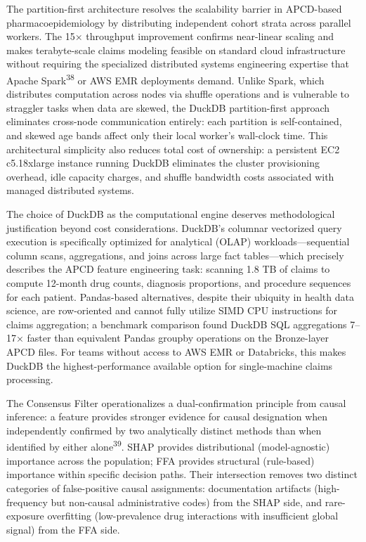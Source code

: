\documentclass[
  12pt,
]{book}
\begin{document}
The partition-first architecture resolves the scalability barrier in
APCD-based pharmacoepidemiology by distributing independent cohort
strata across parallel workers. The 15× throughput improvement confirms
near-linear scaling and makes terabyte-scale claims modeling feasible on
standard cloud infrastructure without requiring the specialized
distributed systems engineering expertise that Apache
Spark\textsuperscript{38} or AWS EMR deployments demand. Unlike Spark,
which distributes computation across nodes via shuffle operations and is
vulnerable to straggler tasks when data are skewed, the DuckDB
partition-first approach eliminates cross-node communication entirely:
each partition is self-contained, and skewed age bands affect only their
local worker's wall-clock time. This architectural simplicity also
reduces total cost of ownership: a persistent EC2 c5.18xlarge instance
running DuckDB eliminates the cluster provisioning overhead, idle
capacity charges, and shuffle bandwidth costs associated with managed
distributed systems.

The choice of DuckDB as the computational engine deserves methodological
justification beyond cost considerations. DuckDB's columnar vectorized
query execution is specifically optimized for analytical (OLAP)
workloads---sequential column scans, aggregations, and joins across
large fact tables---which precisely describes the APCD feature
engineering task: scanning 1.8 TB of claims to compute 12-month drug
counts, diagnosis proportions, and procedure sequences for each patient.
Pandas-based alternatives, despite their ubiquity in health data
science, are row-oriented and cannot fully utilize SIMD CPU instructions
for claims aggregation; a benchmark comparison found DuckDB SQL
aggregations 7--17× faster than equivalent Pandas groupby operations on
the Bronze-layer APCD files. For teams without access to AWS EMR or
Databricks, this makes DuckDB the highest-performance available option
for single-machine claims processing.

The Consensus Filter operationalizes a dual-confirmation principle from
causal inference: a feature provides stronger evidence for causal
designation when independently confirmed by two analytically distinct
methods than when identified by either alone\textsuperscript{39}. SHAP
provides distributional (model-agnostic) importance across the
population; FFA provides structural (rule-based) importance within
specific decision paths. Their intersection removes two distinct
categories of false-positive causal assignments: documentation artifacts
(high-frequency but non-causal administrative codes) from the SHAP side,
and rare-exposure overfitting (low-prevalence drug interactions with
insufficient global signal) from the FFA side.
\end{document}
